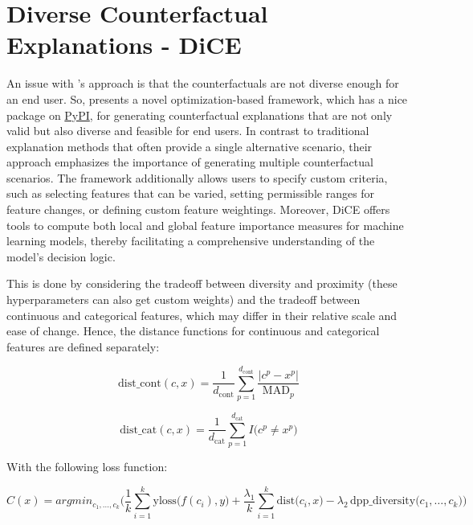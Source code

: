 \section{Diverse Counterfactual Explanations - DiCE}
An issue with \citet{wachter2017counterfactual}'s approach is that the counterfactuals are not diverse enough for an end user. So, \citet{mothilal2020explaining} presents a novel optimization-based framework, which has a nice package on \href{https://pypi.org/project/dice-ml/}{PyPI}, for generating counterfactual explanations that are not only valid but also diverse and feasible for end users. In contrast to traditional explanation methods that often provide a single alternative scenario, their approach emphasizes the importance of generating multiple counterfactual scenarios. The framework additionally allows users to specify custom criteria, such as selecting features that can be varied, setting permissible ranges for feature changes, or defining custom feature weightings. Moreover, DiCE offers tools to compute both local and global feature importance measures for machine learning models, thereby facilitating a comprehensive understanding of the model’s decision logic.

This is done by considering the tradeoff between diversity and proximity (these hyperparameters can also get custom weights) and the tradeoff between continuous and categorical features, which may differ in their relative scale and ease of change. Hence, the distance functions for continuous and categorical features are defined separately:

\begin{equation} \label{eq:dice-dist-cont}
 \text{dist\_cont}(c, x) 
= \frac{1}{d_{\text{cont}}} 
  \sum_{p=1}^{d_{\text{cont}}} 
    \frac{\lvert c^p - x^p \rvert}{\text{MAD}_p}  
\end{equation}

\begin{equation} \label{eq:dice-dist-cat}
 \text{dist\_cat}(c, x) 
= \frac{1}{d_{\text{cat}}} 
  \sum_{p=1}^{d_{\text{cat}}} 
    I\bigl(c^p \neq x^p\bigr)  
\end{equation}

With the following loss function:

\begin{equation} \label{eq:dice-loss}
 C(x) = argmin_{c_1,\ldots,c_k}
\Biggl(
  \frac{1}{k}\sum_{i=1}^k \mathrm{yloss}\bigl(f(c_i), y\bigr)
  + \frac{\lambda_1}{k}\sum_{i=1}^k \mathrm{dist}\bigl(c_i, x\bigr)
  - \lambda_2 \,\mathrm{dpp\_diversity}\bigl(c_1,\ldots,c_k\bigr)
\Biggr)   
\end{equation}

